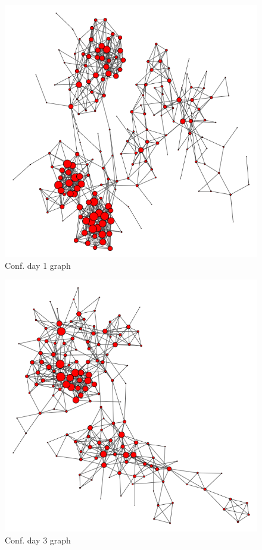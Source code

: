 \documentclass[11pt]{article}
\theoremstyle{definition}
\begin{document}
\begin{appendices}
\begin{figure}[h!]
  \centering
    \includegraphics[width=1\textwidth]{visualisations/day1_visual}
  \caption{Conf. day 1 graph}
  \label{fig:day1}
\end{figure}

\begin{figure}[h!]
  \centering
    \includegraphics[width=1\textwidth]{visualisations/day3_visual}
  \caption{Conf. day 3 graph}
  \label{fig:day3}
\end{figure}


\end{appendices}
\end{document}
